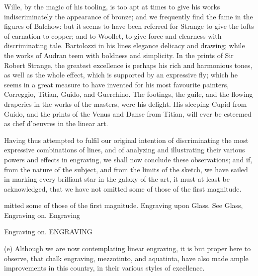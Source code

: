 \documentclass{article}
\begin{document}
Wille, by the magic of his tooling, is too apt at times to give his works indiscriminately the appearance of bronze; and we frequently find the fame in the figures of Balchow: but it seems to have been referred for Strange to give the lofts of carnation to copper; and to Woollet, to give force and clearness with discriminating tale. Bartolozzi in his lines elegance delicacy and drawing; while the works of Audran teem with boldness and simplicity. In the prints of Sir Robert Strange, the greatest excellence is perhaps his rich and harmonious tones, as well as the whole effect, which is supported by an expressive fly; which he seems in a great measure to have invented for his most favourite painters, Correggio, Titian, Guido, and Guerchino. The footings, the guile, and the flowing draperies in the works of the masters, were his delight. His sleeping Cupid from Guido, and the prints of the Venus and Danse from Titian, will ever be esteemed as chef d'oeuvres in the linear art.

Having thus attempted to fulfil our original intention of discriminating the most expressive combinations of lines, and of analyzing and illustrating their various powers and effects in engraving, we shall now conclude these observations; and if, from the nature of the subject, and from the limits of the sketch, we have sailed in marking every brilliant star in the galaxy of the art, it must at least be acknowledged, that we have not omitted some of those of the first magnitude.

mitted some of those of the first magnitude.
Engraving upon Glass. See Glass, Engraving on.
Engraving

Engraving on.
ENGRAVING

(e) Although we are now contemplating linear engraving, it is but proper here to observe, that chalk engraving, mezzotinto, and aquatinta, have also made ample improvements in this country, in their various styles of excellence.
\end{document}
